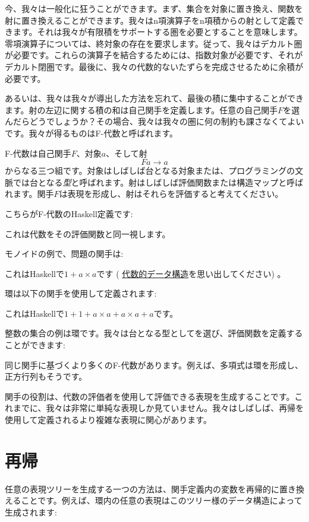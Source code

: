今、我々は一般化に狂うことができます。まず、集合を対象に置き換え、関数を射に置き換えることができます。我々はn項演算子をn項積からの射として定義できます。それは我々が有限積をサポートする圏を必要とすることを意味します。零項演算子については、終対象の存在を要求します。従って、我々はデカルト圏が必要です。これらの演算子を結合するためには、指数対象が必要です、それがデカルト閉圏です。最後に、我々の代数的ないたずらを完成させるために余積が必要です。

あるいは、我々は我々が導出した方法を忘れて、最後の積に集中することができます。射の左辺に関する積の和は自己関手を定義します。任意の自己関手$F$を選んだらどうでしょうか？その場合、我々は我々の圏に何の制約も課さなくてよいです。我々が得るものはF-代数と呼ばれます。

F-代数は自己関手$F$、対象$a$、そして射
\[F a \to a\]
からなる三つ組です。対象はしばしば台となる対象または、プログラミングの文脈では台となる\emph{型}と呼ばれます。射はしばしば評価関数または構造マップと呼ばれます。関手$F$は表現を形成し、射はそれらを評価すると考えてください。

こちらがF-代数のHaskell定義です: 

これは代数をその評価関数と同一視します。

モノイドの例で、問題の関手は: 

これはHaskellで$1 + a\times{}a$です (
\hyperref[simple-algebraic-data-types]{代数的データ構造}を思い出してください) 。

環は以下の関手を使用して定義されます: 

これはHaskellで$1 + 1 + a\times{}a + a\times{}a + a$です。

整数の集合の例は環です。我々は台となる型としてを選び、評価関数を定義することができます: 

同じ関手に基づくより多くのF-代数があります。例えば、多項式は環を形成し、正方行列もそうです。

関手の役割は、代数の評価者を使用して評価できる表現を生成することです。これまでに、我々は非常に単純な表現しか見ていません。我々はしばしば、再帰を使用して定義されるより複雑な表現に関心があります。

\section{再帰}

任意の表現ツリーを生成する一つの方法は、関手定義内の変数を再帰的に置き換えることです。例えば、環内の任意の表現はこのツリー様のデータ構造によって生成されます: 

